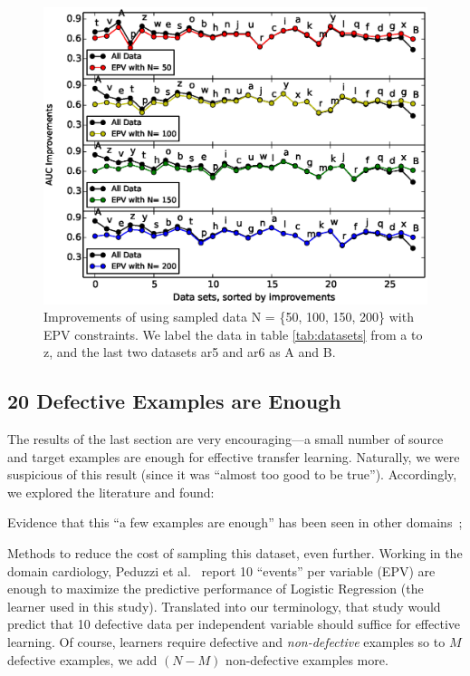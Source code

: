 \begin{figure}[t]
	\centering
	\includegraphics[width=\linewidth]{Figures/raleigh/sample_epv.eps}
	\caption{Improvements of using sampled data N  = \{50, 100, 150, 200\} with EPV constraints. We label the data in table \ref{tab:datasets} from a to z, and the last two datasets ar5 and ar6 as A and B.}
	\label{fig:small_epv}
\end{figure}


\subsection{20 Defective Examples  are Enough}


The results of the last section are very encouraging---a small number of source
and target examples are enough for effective transfer learning. Naturally,
we were suspicious of this result (since it was ``almost too good to be true'').
Accordingly, we explored the literature and found:
\squishlist
    \item Evidence that this ``a few examples are enough'' has been seen in other domains~\cite{peduzzi1996simulation}; 
    \item Methods to reduce the cost of sampling this dataset, even further. 
\squishend
Working in the domain cardiology,
  Peduzzi et al.~\cite{peduzzi1996simulation}
  report 10 ``events'' per variable (EPV) are enough to maximize the predictive performance
  of  Logistic Regression (the learner used in this study). Translated into our terminology,
  that study would predict that  10 defective data per independent variable should
  suffice for effective learning. Of course, learners require defective and {\em non-defective}
  examples so to $M$ defective examples, we add $(N-M)$ non-defective examples more.

